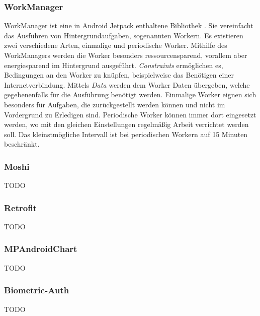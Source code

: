 \documentclass[a4paper]{article}
\begin{document}
\subsubsection{WorkManager}
\label{subsubsec:technologies:bibs:workmanager}
WorkManager ist eine in Android Jetpack enthaltene Bibliothek \autocite{android_workmanager}. Sie vereinfacht das Ausführen von Hintergrundaufgaben, sogenannten Workern. Es existieren zwei verschiedene Arten, einmalige und periodische Worker. Mithilfe des WorkManagers werden die Worker besonders ressourcensparend, vorallem aber energiesparend im Hintergrund ausgeführt. \textit{Constraints} ermöglichen es, Bedingungen an den Worker zu knüpfen, beispielweise das Benötigen einer Internetverbindung. Mittels \textit{Data} werden dem Worker Daten übergeben, welche gegebenenfalls für die Ausführung benötigt werden. Einmalige Worker eignen sich besonders für Aufgaben, die zurückgestellt werden können und nicht im Vordergrund zu Erledigen sind. Periodische Worker können immer dort eingesetzt werden, wo mit den gleichen Einstellungen regelmäßig Arbeit verrichtet werden soll. Das kleinstmögliche Intervall ist bei periodischen Workern auf 15 Minuten beschränkt.


\subsubsection{Moshi}
\label{subsubsec:technologies:bibs:moshi}
TODO


\subsubsection{Retrofit}
\label{subsubsec:technologies:bibs:retrofit}
TODO


\subsubsection{MPAndroidChart}
\label{subsubsec:technologies:bibs:mpandroidchart}
TODO


\subsubsection{Biometric-Auth}
\label{subsubsec:technologies:bibs:biometricauth}
TODO
\end{document}
